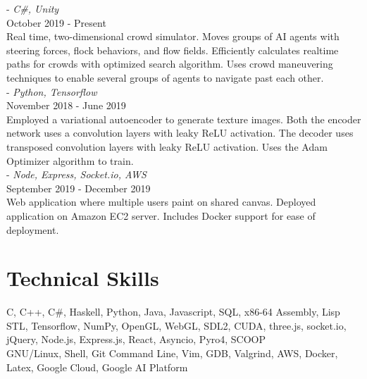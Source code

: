 \documentclass[12pt]{article}
\begin{document}
	 - \emph{C\#, Unity} \\
	\noindent October 2019 - Present \\
	\noindent Real time, two-dimensional crowd simulator. Moves groups of AI agents with steering forces, flock behaviors, and flow fields. Efficiently calculates
	realtime paths for crowds with optimized search algorithm. Uses crowd maneuvering techniques to enable several groups of agents to navigate past
	each other.\\

	 - \emph{Python, Tensorflow} \\
	\noindent November 2018 - June 2019 \\
	\noindent Employed a variational autoencoder to generate texture images. Both the encoder network uses a convolution layers with leaky ReLU activation.
	The decoder uses transposed convolution layers with leaky ReLU activation. Uses the Adam Optimizer algorithm to train. \\

	 - \emph{Node, Express, Socket.io, AWS} \\
	\noindent September 2019 - December 2019 \\
	\noindent Web application where multiple users paint on shared canvas. Deployed application on Amazon EC2 server. Includes Docker support for ease
	of deployment.

	\section*{Technical Skills}
		 \normalsize{C, C++, C\#, Haskell, Python, Java, Javascript, SQL, x86-64 Assembly, Lisp}\\
		  \normalsize{STL, Tensorflow, NumPy, OpenGL, WebGL, SDL2, CUDA, three.js, socket.io, jQuery, Node.js, Express.js, React, Asyncio, Pyro4, SCOOP}\\
		 \normalsize{GNU/Linux, Shell, Git Command Line, Vim, GDB, Valgrind, AWS, Docker, Latex, Google Cloud, Google AI Platform}\\
\end{document}
